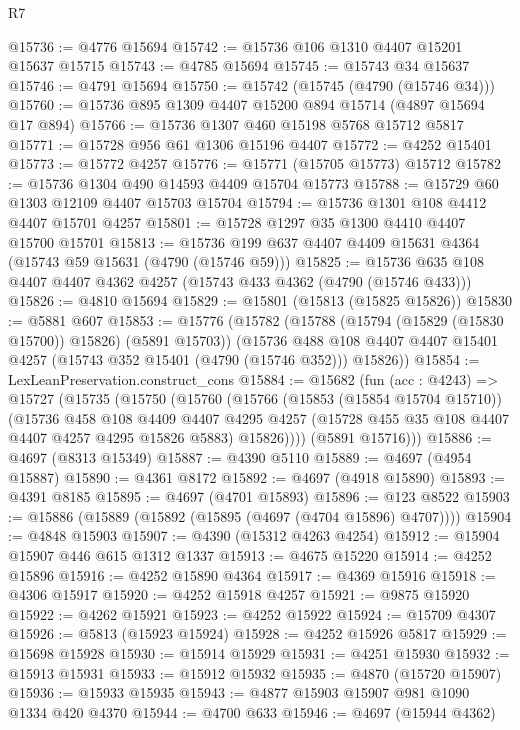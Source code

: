 \begin{lexlean}{R7}
\begin{coremodule}
@15736 := @4776 @15694
@15742 := @15736 @106 @1310 @4407 @15201 @15637 @15715
@15743 := @4785 @15694
@15745 := @15743 @34 @15637
@15746 := @4791 @15694
@15750 := @15742 (@15745 (@4790 (@15746 @34)))
@15760 := @15736 @895 @1309 @4407 @15200 @894 @15714 (@4897 @15694 @17 @894)
@15766 := @15736 @1307 @460 @15198 @5768 @15712 @5817
@15771 := @15728 @956 @61 @1306 @15196 @4407
@15772 := @4252 @15401
@15773 := @15772 @4257
@15776 := @15771 (@15705 @15773) @15712
@15782 := @15736 @1304 @490 @14593 @4409 @15704 @15773
@15788 := @15729 @60 @1303 @12109 @4407 @15703 @15704
@15794 := @15736 @1301 @108 @4412 @4407 @15701 @4257
@15801 := @15728 @1297 @35 @1300 @4410 @4407 @15700 @15701
@15813 := @15736 @199 @637 @4407 @4409 @15631 @4364 (@15743 @59 @15631 (@4790 (@15746 @59)))
@15825 := @15736 @635 @108 @4407 @4407 @4362 @4257 (@15743 @433 @4362 (@4790 (@15746 @433)))
@15826 := @4810 @15694
@15829 := @15801 (@15813 (@15825 @15826))
@15830 := @5881 @607
@15853 := @15776
    (@15782
      (@15788 (@15794 (@15829 (@15830 @15700)) @15826) (@5891 @15703))
      (@15736 @488 @108 @4407 @4407 @15401 @4257 (@15743 @352 @15401 (@4790 (@15746 @352))) @15826))
@15854 := LexLeanPreservation.construct_cons
@15884 := @15682
    (fun (acc : @4243) =>
    @15727
      (@15735
        (@15750
          (@15760
            (@15766
              (@15853 (@15854 @15704 @15710))
              (@15736
                @458
                @108
                @4409
                @4407
                @4295
                @4257
                (@15728 @455 @35 @108 @4407 @4407 @4257 @4295 @15826 @5883)
                @15826))))
        (@5891 @15716)))
@15886 := @4697 (@8313 @15349)
@15887 := @4390 @5110
@15889 := @4697 (@4954 @15887)
@15890 := @4361 @8172
@15892 := @4697 (@4918 @15890)
@15893 := @4391 @8185
@15895 := @4697 (@4701 @15893)
@15896 := @123 @8522
@15903 := @15886 (@15889 (@15892 (@15895 (@4697 (@4704 @15896) @4707))))
@15904 := @4848 @15903
@15907 := @4390 (@15312 @4263 @4254)
@15912 := @15904 @15907 @446 @615 @1312 @1337
@15913 := @4675 @15220
@15914 := @4252 @15896
@15916 := @4252 @15890 @4364
@15917 := @4369 @15916
@15918 := @4306 @15917
@15920 := @4252 @15918 @4257
@15921 := @9875 @15920
@15922 := @4262 @15921
@15923 := @4252 @15922
@15924 := @15709 @4307
@15926 := @5813 (@15923 @15924)
@15928 := @4252 @15926 @5817
@15929 := @15698 @15928
@15930 := @15914 @15929
@15931 := @4251 @15930
@15932 := @15913 @15931
@15933 := @15912 @15932
@15935 := @4870 (@15720 @15907)
@15936 := @15933 @15935
@15943 := @4877 @15903 @15907 @981 @1090 @1334 @420 @4370
@15944 := @4700 @633
@15946 := @4697 (@15944 @4362)

\end{coremodule}
\end{lexlean}
